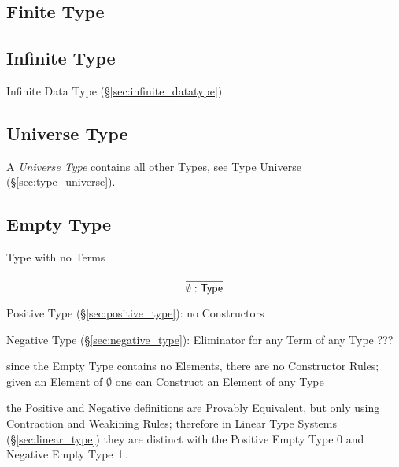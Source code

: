 \subsection{Finite Type}\label{sec:finite_type}

\subsection{Infinite Type}\label{sec:infinite_type}

Infinite Data Type (\S\ref{sec:infinite_datatype})



\subsection{Universe Type}\label{sec:universe_type}

A \emph{Universe Type} contains all other Types, see Type Universe
(\S\ref{sec:type_universe}).



\subsection{Empty Type}\label{sec:empty_type}

Type with no Terms

\[
  \frac{}
  {\emptyset:\mathsf{Type}}
\]


Positive Type (\S\ref{sec:positive_type}): no Constructors

Negative Type (\S\ref{sec:negative_type}): Eliminator for any Term of
any Type ???

since the Empty Type contains no Elements, there are no Constructor
Rules; given an Element of $\emptyset$ one can Construct an Element of
any Type

the Positive and Negative definitions are Provably Equivalent, but
only using Contraction and Weakining Rules; therefore in Linear Type
Systems (\S\ref{sec:linear_type}) they are distinct with the Positive
Empty Type $0$ and Negative Empty Type $\bot$.

